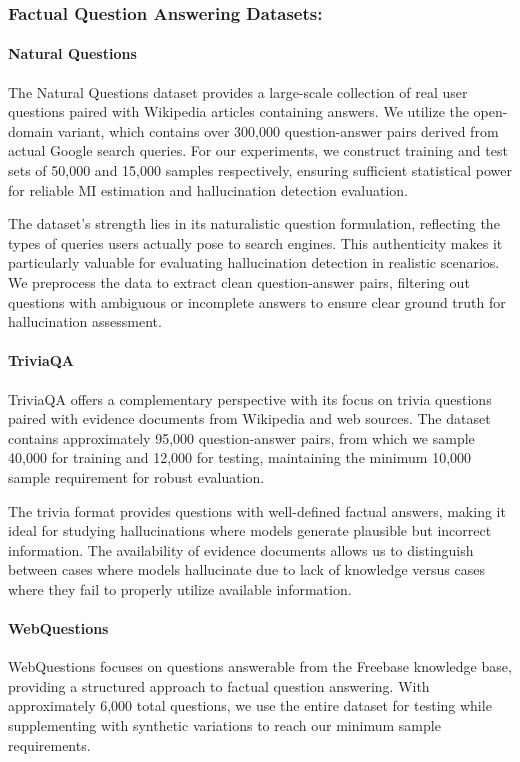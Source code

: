 \subsubsection{Factual Question Answering Datasets:}

\paragraph{Natural Questions}
The Natural Questions dataset \citep{kwiatkowski2019natural} provides a large-scale collection of real user questions paired with Wikipedia articles containing answers. We utilize the open-domain variant, which contains over 300,000 question-answer pairs derived from actual Google search queries. For our experiments, we construct training and test sets of 50,000 and 15,000 samples respectively, ensuring sufficient statistical power for reliable MI estimation and hallucination detection evaluation.

The dataset's strength lies in its naturalistic question formulation, reflecting the types of queries users actually pose to search engines. This authenticity makes it particularly valuable for evaluating hallucination detection in realistic scenarios. We preprocess the data to extract clean question-answer pairs, filtering out questions with ambiguous or incomplete answers to ensure clear ground truth for hallucination assessment.

\paragraph{TriviaQA}
TriviaQA \citep{joshi2017triviaqa} offers a complementary perspective with its focus on trivia questions paired with evidence documents from Wikipedia and web sources. The dataset contains approximately 95,000 question-answer pairs, from which we sample 40,000 for training and 12,000 for testing, maintaining the minimum 10,000 sample requirement for robust evaluation.

The trivia format provides questions with well-defined factual answers, making it ideal for studying hallucinations where models generate plausible but incorrect information. The availability of evidence documents allows us to distinguish between cases where models hallucinate due to lack of knowledge versus cases where they fail to properly utilize available information.

\paragraph{WebQuestions}
WebQuestions \citep{berant2013semantic} focuses on questions answerable from the Freebase knowledge base, providing a structured approach to factual question answering. With approximately 6,000 total questions, we use the entire dataset for testing while supplementing with synthetic variations to reach our minimum sample requirements.


